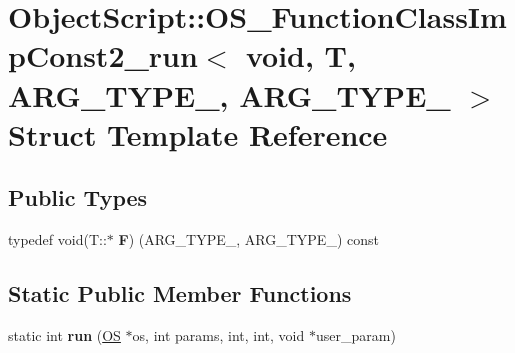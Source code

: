 \hypertarget{struct_object_script_1_1_o_s___function_class_imp_const2__run_3_01void_00_01_t_00_01_01_01_a_r_g31c02ec44dbd119b5401cdeec43a92d1}{}\section{Object\+Script\+:\+:O\+S\+\_\+\+Function\+Class\+Imp\+Const2\+\_\+run$<$ void, T, A\+R\+G\+\_\+\+T\+Y\+P\+E\+\_, A\+R\+G\+\_\+\+T\+Y\+P\+E\+\_ $>$ Struct Template Reference}
\label{struct_object_script_1_1_o_s___function_class_imp_const2__run_3_01void_00_01_t_00_01_01_01_a_r_g31c02ec44dbd119b5401cdeec43a92d1}
\subsection*{Public Types}
\begin{DoxyCompactItemize}
\item 
typedef void(T\+::$\ast$ {\bfseries F}) (A\+R\+G\+\_\+\+T\+Y\+P\+E\+\_, A\+R\+G\+\_\+\+T\+Y\+P\+E\+\_) const \hypertarget{struct_object_script_1_1_o_s___function_class_imp_const2__run_3_01void_00_01_t_00_01_01_01_a_r_g31c02ec44dbd119b5401cdeec43a92d1_ab6048fa77f0817ea6e3311b6df558790}{}\label{struct_object_script_1_1_o_s___function_class_imp_const2__run_3_01void_00_01_t_00_01_01_01_a_r_g31c02ec44dbd119b5401cdeec43a92d1_ab6048fa77f0817ea6e3311b6df558790}

\end{DoxyCompactItemize}
\subsection*{Static Public Member Functions}
\begin{DoxyCompactItemize}
\item 
static int {\bfseries run} (\hyperlink{class_object_script_1_1_o_s}{OS} $\ast$os, int params, int, int, void $\ast$user\+\_\+param)\hypertarget{struct_object_script_1_1_o_s___function_class_imp_const2__run_3_01void_00_01_t_00_01_01_01_a_r_g31c02ec44dbd119b5401cdeec43a92d1_a33acc24eaac634d63133d595daa5e7c5}{}\label{struct_object_script_1_1_o_s___function_class_imp_const2__run_3_01void_00_01_t_00_01_01_01_a_r_g31c02ec44dbd119b5401cdeec43a92d1_a33acc24eaac634d63133d595daa5e7c5}

\end{DoxyCompactItemize}


